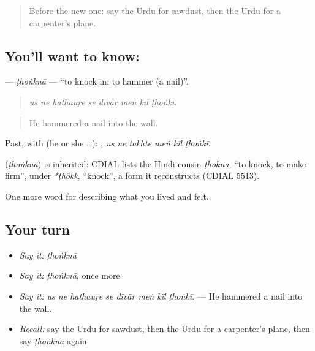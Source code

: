 \begin{quote}
Before the new one: say the Urdu for sawdust, then the Urdu for a carpenter's plane.
\end{quote}

\subsection*{You'll want to know: }
\textbf{} — \emph{ṭhoṅknā} — \textquotedblleft{}to knock in; to hammer (a nail)\textquotedblright{}.

\begin{quote}
       
\end{quote}

\begin{quote}
\emph{us ne hathauṛe se dīvār meṅ kīl ṭhoṅkī.}
\end{quote}

\begin{quote}
He hammered a nail into the wall.
\end{quote}

Past, with  (he or she …):      , \emph{us ne takhte meṅ kīl ṭhoṅkī}.

\begin{cousinweb}
\textbf{} (\emph{ṭhoṅknā}) is inherited: CDIAL lists the Hindi cousin \emph{ṭhoknā}, \textquotedblleft{}to knock, to make firm\textquotedblright{}, under \emph{*ṭhōkk}, \textquotedblleft{}knock\textquotedblright{}, a form it reconstructs (CDIAL 5513).
\end{cousinweb}

\begin{grammarlens}[title={What you've built}]
One more word for describing what you lived and felt.
\end{grammarlens}

\subsection*{Your turn}
\begin{itemize}
\raggedright
  \item \emph{Say it:} \emph{ṭhoṅknā}
  \item \emph{Say it:} \emph{ṭhoṅknā}, once more
  \item \emph{Say it:} \emph{us ne hathauṛe se dīvār meṅ kīl ṭhoṅkī.} — He hammered a nail into the wall.
  \item \emph{Recall:} say the Urdu for sawdust, then the Urdu for a carpenter's plane, then say \emph{ṭhoṅknā} again
\end{itemize}


